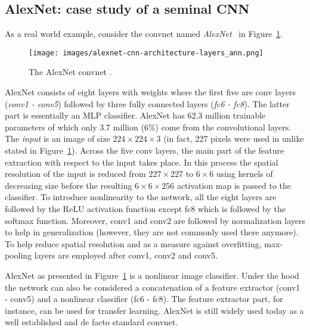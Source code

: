 \documentclass[a4paper,12pt]{report}
\begin{document}
\subsection{AlexNet: case study of a seminal CNN}\label{subsubsec:alexnet}
As a real world example, consider the convnet named \textit{AlexNet}~\cite{AlexNet} in Figure~\ref{fig:AlexNet}.
\begin{figure}[ht]
\centering
\texttt{[image: images/alexnet-cnn-architecture-layers\_ann.png]}
\caption{The AlexNet convnet \cite{AlexNet}.}
\label{fig:AlexNet}
\end{figure}
AlexNet consists of eight layers with weights where the first five are conv layers (\textit{conv1 - conv5}) followed by three fully connected layers (\textit{fc6 - fc8}). The latter part is essentially an MLP classifier. AlexNet has 62.3 million trainable parameters of which only 3.7 million (6\%) come from the convolutional layers. The \textit{input} is an image of size $224 \times 224 \times 3$ (in fact, 227 pixels were used in \cite{AlexNet} unlike stated in Figure~\ref{fig:AlexNet}). Across the five conv layers, the main part of the feature extraction with respect to the input takes place. In this process the spatial resolution of the input is reduced from $227 \times 227$ to $6 \times 6$ using kernels of decreasing size before the resulting $6 \times 6 \times 256$ activation map is passed to the classifier. To introduce nonlinearity to the network, all the eight layers are followed by the ReLU activation function except fc8 which is followed by the softmax function. Moreover, conv1 and conv2 are followed by normalization layers to help in generalization (however, they are not commonly used there anymore). To help reduce spatial resolution and as a measure against overfitting, max-pooling layers are employed after conv1, conv2 and conv5. 

AlexNet as presented in Figure~\ref{fig:AlexNet} is a nonlinear image classifier. Under the hood the network can also be considered a concatenation of a feature extractor (conv1 - conv5) and a nonlinear classifier (fc6 - fc8). The feature extractor part, for instance, can be used for transfer learning. AlexNet is still widely used today as a well established and de facto standard convnet.
\end{document}
